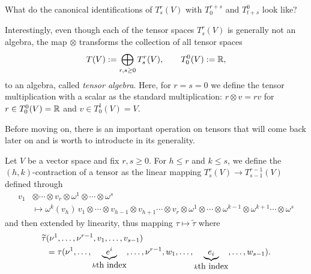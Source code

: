 \begin{exercise}
  What do the canonical identifications of $T_s^r(V)$ with $T_0^{r+s}$ and $T_{t+s}^0$ look like?
\end{exercise}

\begin{remark}
  Interestingly, even though each of the tensor spaces $T_s^r(V)$ is generally not an algebra, the map $\otimes$ transforms the collection of all tensor spaces
  \begin{equation}
    T(V) := \bigoplus_{r,s\geq 0} T_s^r(V), \qquad T_0^0(V):= \mathbb{R},
  \end{equation}
  to an algebra, called \emph{tensor algebra}.
  Here, for $r=s=0$ we define the tensor multiplication with a scalar as the standard multiplication: $r\otimes v = r v$ for $r\in T_0^0(V)=\mathbb{R}$ and $v\in T^1_0(V)=V$.
\end{remark}

Before moving on, there is an important operation on tensors that will come back later on and is worth to introducte in its generality.

\begin{definition}
Let $V$ be a vector space and fix $r,s\geq0$.
For $h\leq r$ and $k\leq s$, we define the $(h,k)$-contraction of a tensor as the linear mapping $T_s^r(V)\to T_{s-1}^{r-1}(V)$ defined through
\begin{align}
  v_1&\otimes\cdots\otimes v_r\otimes\omega^1\otimes\cdots\otimes\omega^s \\
  &\mapsto \omega^k(v_h)\, v_1\otimes\cdots\otimes v_{h-1}\otimes v_{h+1}\cdots\otimes v_r\otimes\omega^1\otimes\cdots\otimes\omega^{k-1}\otimes\omega^{k+1}\cdots\otimes\omega^s
\end{align}
and then extended by linearity, thus mapping $\tau \mapsto \widetilde\tau$ where
\begin{align}
  \widetilde\tau&(\nu^1,\ldots,\nu^{r-1}, v_1,\ldots,v_{s-1}) \\
  &= \tau(\nu^1,\ldots,\LaTeXunderbrace{e^i}_{h\mbox{th index}},\ldots,\nu^{r-1},w_1,\ldots,\LaTeXunderbrace{e_i}_{k\mbox{th index}},\ldots,w_{s-1}).
\end{align}
\end{definition}

